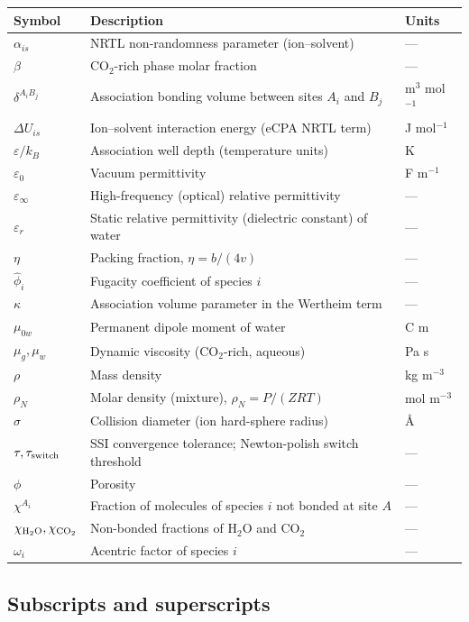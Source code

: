 \documentclass[preprint,12pt,number]{elsarticle}
\begin{document}
\begin{tabular}{@{}lll@{}}
  \toprule
  Symbol & Description & Units \\
  \midrule
  $\alpha_{is}$ & NRTL non-randomness parameter (ion--solvent) & --- \\
  $\beta$ & CO$_2$-rich phase molar fraction & --- \\
  $\delta^{A_iB_j}$ & Association bonding volume between sites $A_i$ and $B_j$ & m$^3$ mol$^{-1}$ \\
  $\Delta U_{is}$ & Ion--solvent interaction energy (eCPA NRTL term) & J mol$^{-1}$ \\
  $\varepsilon/k_B$ & Association well depth (temperature units) & K \\
  $\varepsilon_0$ & Vacuum permittivity & F m$^{-1}$ \\
  $\varepsilon_\infty$ & High-frequency (optical) relative permittivity & --- \\
  $\varepsilon_r$ & Static relative permittivity (dielectric constant) of water & --- \\
  $\eta$ & Packing fraction, $\eta = b/(4v)$ & --- \\
  $\hat{\phi}_i$ & Fugacity coefficient of species $i$ & --- \\
  $\kappa$ & Association volume parameter in the Wertheim term & --- \\
  $\mu_{0w}$ & Permanent dipole moment of water & C m \\
  $\mu_g, \mu_w$ & Dynamic viscosity (CO$_2$-rich, aqueous) & Pa s \\
  $\rho$ & Mass density & kg m$^{-3}$ \\
  $\rho_N$ & Molar density (mixture), $\rho_N = P/(ZRT)$ & mol m$^{-3}$ \\
  $\sigma$ & Collision diameter (ion hard-sphere radius) & \AA \\
  $\tau, \tau_{\rm switch}$ & SSI convergence tolerance; Newton-polish switch threshold & --- \\
  $\phi$ & Porosity & --- \\
  $\chi^{A_i}$ & Fraction of molecules of species $i$ not bonded at site $A$ & --- \\
  $\chi_{\rm H_2O}, \chi_{\rm CO_2}$ & Non-bonded fractions of H$_2$O and CO$_2$ & --- \\
  $\omega_i$ & Acentric factor of species $i$ & --- \\
  \bottomrule
\end{tabular}

\subsection*{Subscripts and superscripts}
\end{document}
